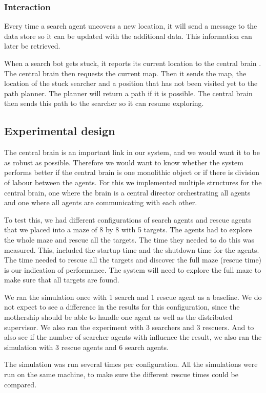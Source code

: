 \subsubsection{Interaction}
Every time a search agent uncovers a new location, it will send a message to
the data store so it can be updated with the additional data. This information
can later be retrieved.

When a search bot gets stuck, it reports its current location to the central
brain . The central brain then requests the current map. Then it sends the
map, the location of the stuck searcher and a position that has not been
visited yet to the path planner. The planner will return a path if it is
possible. The central brain then sends this path to the searcher so it can
resume exploring.

\subsection{Experimental design}
The central brain is an important link in our system, and we would want it to
be as robust as possible. Therefore we would want to know whether the
system performs better if the central brain is one monolithic object or if
there is division of labour between the agents. For this we implemented
multiple structures for the central brain, one where the brain is a central
director orchestrating all agents and one where all agents are
communicating with each other. 

To test this, we had different configurations of search agents and rescue
agents that we placed into a maze of 8 by 8 with 5 targets. The agents had
to explore the whole maze and rescue all the targets. The time they needed
to do this was measured. This, included the startup time and the shutdown
time for the agents. The time needed to rescue all the targets and discover
the full maze (rescue time) is our indication of performance. The system
will need to explore the full maze to make sure that all targets are found.

We ran the simulation once with 1 search and 1 rescue agent as a baseline.
We do not expect to see a difference in the results for this configuration,
since the mothership should be able to handle one agent as well as the
distributed supervisor. We also ran the experiment with 3 searchers and 3
rescuers. And to also see if the number of searcher agents with influence
the result, we also ran the simulation with 3 rescue agents and 6 search
agents. 

The simulation was run several times per configuration. All the simulations
were run on the same machine, to make sure the different rescue times could
be compared. 

